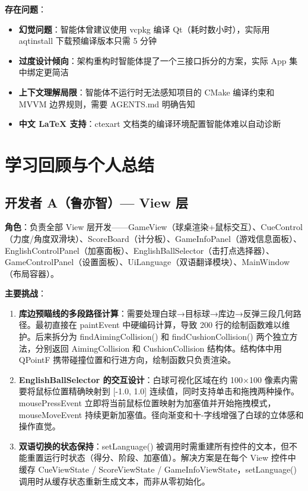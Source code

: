 \documentclass[11pt]{ctexart}
\begin{document}
\textbf{存在问题}：
\begin{itemize}
\item \textbf{幻觉问题}：智能体曾建议使用 vcpkg 编译 Qt（耗时数小时），实际用 aqtinstall 下载预编译版本只需 5 分钟
\item \textbf{过度设计倾向}：架构重构时智能体提了一个三接口拆分的方案，实际 App 集中绑定更简洁
\item \textbf{上下文理解局限}：智能体不运行时无法感知项目的 CMake 编译约束和 MVVM 边界规则，需要 AGENTS.md 明确告知
\item \textbf{中文 LaTeX 支持}：ctexart 文档类的编译环境配置智能体难以自动诊断
\end{itemize}

\section{学习回顾与个人总结}

\subsection{开发者 A（鲁亦智）— View 层}

\textbf{角色}：负责全部 View 层开发——GameView（球桌渲染+鼠标交互）、CueControl（力度/角度双滑块）、ScoreBoard（计分板）、GameInfoPanel（游戏信息面板）、EnglishControlPanel（加塞面板）、EnglishBallSelector（击打点选择器）、GameControlPanel（设置面板）、UiLanguage（双语翻译模块）、MainWindow（布局容器）。

\textbf{主要挑战}：
\begin{enumerate}[leftmargin=*]
\item \textbf{库边预瞄线的多段路径计算}：需要处理白球→目标球→库边→反弹三段几何路径。最初直接在 paintEvent 中硬编码计算，导致 200 行的绘制函数难以维护。后来拆分为 findAimingCollision() 和 findCushionCollision() 两个独立方法，分别返回 AimingCollision 和 CushionCollision 结构体。结构体中用 QPointF 携带碰撞位置和行进方向，绘制函数只负责渲染。
\item \textbf{EnglishBallSelector 的交互设计}：白球可视化区域在约 100×100 像素内需要将鼠标位置精确映射到 [-1.0, 1.0] 连续值，同时支持单击和拖拽两种操作。mousePressEvent 立即将当前鼠标位置映射为加塞值并开始拖拽模式，mouseMoveEvent 持续更新加塞值。径向渐变和十-字线增强了白球的立体感和操作直觉。
\item \textbf{双语切换的状态保持}：setLanguage() 被调用时需重建所有控件的文本，但不能重置运行时状态（得分、阶段、加塞值）。解决方案是在每个 View 控件中缓存 CueViewState / ScoreViewState / GameInfoViewState，setLanguage() 调用时从缓存状态重新生成文本，而非从零初始化。
\end{enumerate}
\end{document}
